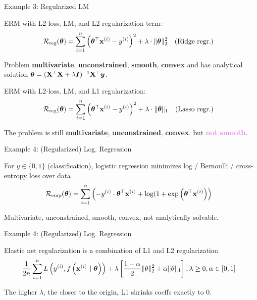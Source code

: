 \documentclass[11pt,compress,t,notes=noshow, xcolor=table]{beamer}
\begin{document}
\begin{framei}[fs=footnotesize]{Example 3: Regularized LM}
\item ERM with L2 loss, LM, and L2 regularization term:
$$ \mathcal{R}_{\text{reg}}(\bm{\theta}) = \sum\limits_{i=1}^n \left(\bm{\theta}^\top \mathbf{x}^{(i)} - y^{(i)}\right)^2  + \lambda \cdot \|\bm{\theta}\|_2^2 \quad \text{(Ridge regr.)} $$
\item Problem \textbf{multivariate}, \textbf{unconstrained}, \textbf{smooth}, \textbf{convex} and has analytical solution $\bm{\theta} = (\mathbf{X}^\top \mathbf{X} + \lambda \bm{I})^{-1}\mathbf{X}^\top \bm{y}$.
\item ERM with L2-loss, LM, and L1 regularization:
$$ \mathcal{R}_{\text{reg}}(\bm{\theta}) = \sum\limits_{i=1}^n \left(\bm{\theta}^\top \mathbf{x}^{(i)} - y^{(i)}\right)^2  + \lambda \cdot \|\bm{\theta}\|_1 \quad \text{(Lasso regr.)} $$
\item The problem is still \textbf{multivariate}, \textbf{unconstrained}, \textbf{convex}, but \textcolor{violet}{\textbf{not smooth}}.
\vfill
{}
\end{framei}


\begin{framei}{Example 4: (Regularized) Log. Regression}
\item For $y \in \{0, 1\}$ (classification), logistic regression minimizes log / Bernoulli / cross-entropy loss over data
$$ \mathcal{R}_{\text{emp}}(\bm{\theta}) = \sum\limits_{i=1}^n \left(-y^{(i)} \cdot \bm{\theta}^\top\mathbf{x}^{(i)} + \log(1 + \exp\left(\bm{\theta}^\top\mathbf{x}^{(i)}\right)\right) $$
\item Multivariate, unconstrained, smooth, convex, not analytically solvable.
\vfill
{}
\end{framei}


\begin{framei}[fs=footnotesize]{Example 4: (Regularized) Log. Regression}
\item Elastic net regularization is a combination of L1 and L2 regularization
$$ \frac{1}{2n} \sum\limits_{i=1}^n L\left(y^{(i)}, f\left(\mathbf{x}^{(i)} ~|~ \bm{\theta}\right)\right) + \lambda \left[\frac{1-\alpha}{2}\|\theta\|^{2}_{2} + \alpha\|\theta\|_{1}\right], \lambda \geq 0, \alpha \in [0,1] $$
\vfill
{}
\item The higher $\lambda$, the closer to the origin, L1 shrinks coeffs exactly to 0.
\end{framei}
\end{document}
